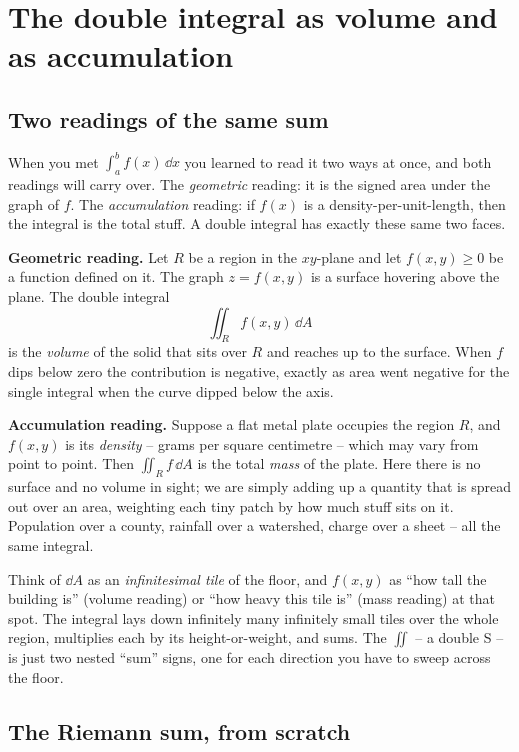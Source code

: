 \section{The double integral as volume and as accumulation}
\label{ch34:double}

\subsection{Two readings of the same sum}

When you met $\int_a^b f(x)\,\dd x$ you learned to read it two ways at once, and
both readings will carry over. The \emph{geometric} reading: it is the signed
area under the graph of $f$. The \emph{accumulation} reading: if $f(x)$ is a
density-per-unit-length, then the integral is the total stuff. A double integral
has exactly these same two faces.

\textbf{Geometric reading.} Let $R$ be a region in the $xy$-plane and let
$f(x,y)\ge 0$ be a function defined on it. The graph $z=f(x,y)$ is a surface
hovering above the plane. The double integral
\[
  \iint_R f(x,y)\,\dd A
\]
is the \emph{volume} of the solid that sits over $R$ and reaches up to the
surface. When $f$ dips below zero the contribution is negative, exactly as area
went negative for the single integral when the curve dipped below the axis.

\textbf{Accumulation reading.} Suppose a flat metal plate occupies the region
$R$, and $f(x,y)$ is its \emph{density} -- grams per square centimetre -- which
may vary from point to point. Then $\iint_R f\,\dd A$ is the total \emph{mass} of
the plate. Here there is no surface and no volume in sight; we are simply adding
up a quantity that is spread out over an area, weighting each tiny patch by how
much stuff sits on it. Population over a county, rainfall over a watershed,
charge over a sheet -- all the same integral.

\begin{intuitionbox}
Think of $\dd A$ as an \emph{infinitesimal tile} of the floor, and $f(x,y)$ as
``how tall the building is'' (volume reading) or ``how heavy this tile is''
(mass reading) at that spot. The integral lays down infinitely many infinitely
small tiles over the whole region, multiplies each by its height-or-weight, and
sums. The $\iint$ -- a double S -- is just two nested ``sum'' signs, one for each
direction you have to sweep across the floor.
\end{intuitionbox}

\subsection{The Riemann sum, from scratch}

